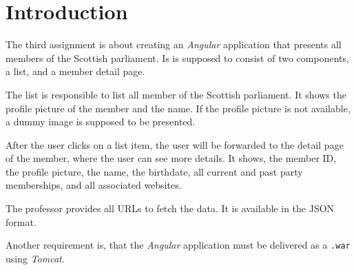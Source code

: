 \section{Introduction}\label{sec:01_intro}
The third assignment is about creating an \textit{Angular} application that presents all members of the Scottish parliament.
Is is supposed to consist of two components, a list, and a member detail page.

The list is responsible to list all member of the Scottish parliament. It shows the profile picture of the member and the name. If the profile picture is not available, a dummy image is supposed to be presented.

After the user clicks on a list item, the user will be forwarded to the detail page of the member, where the user can see more details. It shows, the member ID, the profile picture, the name, the birthdate, all current and past party memberships, and all associated websites.

The professor provides all URLs to fetch the data. It is available in the JSON format.


Another requirement is, that the \textit{Angular} application must be delivered as a \texttt{.war} using \textit{Tomcat}.

